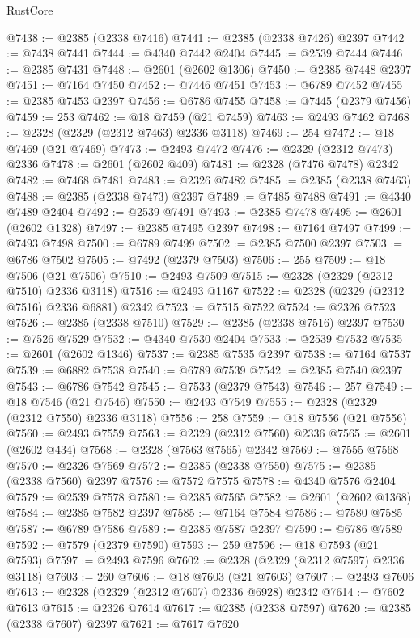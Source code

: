 \begin{lexlean}{RustCore}
\begin{coremodule}
@7438 := @2385 (@2338 @7416)
@7441 := @2385 (@2338 @7426) @2397
@7442 := @7438 @7441
@7444 := @4340 @7442 @2404
@7445 := @2539 @7444
@7446 := @2385 @7431
@7448 := @2601 (@2602 @1306)
@7450 := @2385 @7448 @2397
@7451 := @7164 @7450
@7452 := @7446 @7451
@7453 := @6789 @7452
@7455 := @2385 @7453 @2397
@7456 := @6786 @7455
@7458 := @7445 (@2379 @7456)
@7459 := 253
@7462 := @18 @7459 (@21 @7459)
@7463 := @2493 @7462
@7468 := @2328 (@2329 (@2312 @7463) @2336 @3118)
@7469 := 254
@7472 := @18 @7469 (@21 @7469)
@7473 := @2493 @7472
@7476 := @2329 (@2312 @7473) @2336
@7478 := @2601 (@2602 @409)
@7481 := @2328 (@7476 @7478) @2342
@7482 := @7468 @7481
@7483 := @2326 @7482
@7485 := @2385 (@2338 @7463)
@7488 := @2385 (@2338 @7473) @2397
@7489 := @7485 @7488
@7491 := @4340 @7489 @2404
@7492 := @2539 @7491
@7493 := @2385 @7478
@7495 := @2601 (@2602 @1328)
@7497 := @2385 @7495 @2397
@7498 := @7164 @7497
@7499 := @7493 @7498
@7500 := @6789 @7499
@7502 := @2385 @7500 @2397
@7503 := @6786 @7502
@7505 := @7492 (@2379 @7503)
@7506 := 255
@7509 := @18 @7506 (@21 @7506)
@7510 := @2493 @7509
@7515 := @2328 (@2329 (@2312 @7510) @2336 @3118)
@7516 := @2493 @1167
@7522 := @2328 (@2329 (@2312 @7516) @2336 @6881) @2342
@7523 := @7515 @7522
@7524 := @2326 @7523
@7526 := @2385 (@2338 @7510)
@7529 := @2385 (@2338 @7516) @2397
@7530 := @7526 @7529
@7532 := @4340 @7530 @2404
@7533 := @2539 @7532
@7535 := @2601 (@2602 @1346)
@7537 := @2385 @7535 @2397
@7538 := @7164 @7537
@7539 := @6882 @7538
@7540 := @6789 @7539
@7542 := @2385 @7540 @2397
@7543 := @6786 @7542
@7545 := @7533 (@2379 @7543)
@7546 := 257
@7549 := @18 @7546 (@21 @7546)
@7550 := @2493 @7549
@7555 := @2328 (@2329 (@2312 @7550) @2336 @3118)
@7556 := 258
@7559 := @18 @7556 (@21 @7556)
@7560 := @2493 @7559
@7563 := @2329 (@2312 @7560) @2336
@7565 := @2601 (@2602 @434)
@7568 := @2328 (@7563 @7565) @2342
@7569 := @7555 @7568
@7570 := @2326 @7569
@7572 := @2385 (@2338 @7550)
@7575 := @2385 (@2338 @7560) @2397
@7576 := @7572 @7575
@7578 := @4340 @7576 @2404
@7579 := @2539 @7578
@7580 := @2385 @7565
@7582 := @2601 (@2602 @1368)
@7584 := @2385 @7582 @2397
@7585 := @7164 @7584
@7586 := @7580 @7585
@7587 := @6789 @7586
@7589 := @2385 @7587 @2397
@7590 := @6786 @7589
@7592 := @7579 (@2379 @7590)
@7593 := 259
@7596 := @18 @7593 (@21 @7593)
@7597 := @2493 @7596
@7602 := @2328 (@2329 (@2312 @7597) @2336 @3118)
@7603 := 260
@7606 := @18 @7603 (@21 @7603)
@7607 := @2493 @7606
@7613 := @2328 (@2329 (@2312 @7607) @2336 @6928) @2342
@7614 := @7602 @7613
@7615 := @2326 @7614
@7617 := @2385 (@2338 @7597)
@7620 := @2385 (@2338 @7607) @2397
@7621 := @7617 @7620

\end{coremodule}
\end{lexlean}
